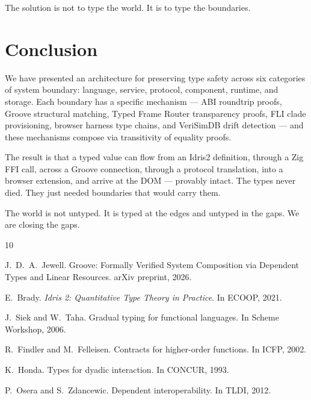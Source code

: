 \documentclass[11pt,a4paper]{article}
\begin{document}
The solution is not to type the world. It is to type the boundaries.

\section{Conclusion}

We have presented an architecture for preserving type safety across six
categories of system boundary: language, service, protocol, component,
runtime, and storage. Each boundary has a specific mechanism ---
ABI roundtrip proofs, Groove structural matching, Typed Frame Router
transparency proofs, FLI clade provisioning, browser harness type
chains, and VeriSimDB drift detection --- and these mechanisms compose
via transitivity of equality proofs.

The result is that a typed value can flow from an Idris2 definition,
through a Zig FFI call, across a Groove connection, through a protocol
translation, into a browser extension, and arrive at the DOM ---
provably intact. The types never died. They just needed boundaries
that would carry them.

The world is not untyped. It is typed at the edges and untyped in the
gaps. We are closing the gaps.


\begin{thebibliography}{10}

J.~D.~A.~Jewell.
\newblock Groove: Formally Verified System Composition via Dependent Types and
  Linear Resources.
\newblock arXiv preprint, 2026.

E.~Brady.
\newblock \emph{Idris 2: Quantitative Type Theory in Practice}.
\newblock In ECOOP, 2021.

J.~Siek and W.~Taha.
\newblock Gradual typing for functional languages.
\newblock In Scheme Workshop, 2006.

R.~Findler and M.~Felleisen.
\newblock Contracts for higher-order functions.
\newblock In ICFP, 2002.

K.~Honda.
\newblock Types for dyadic interaction.
\newblock In CONCUR, 1993.

P.~Osera and S.~Zdancewic.
\newblock Dependent interoperability.
\newblock In TLDI, 2012.

\end{thebibliography}
\end{document}
